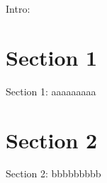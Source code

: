 \minitoc

\vspace{0.5cm}
Intro:

\section{Section 1}
Section 1: aaaaaaaaa

\section{Section 2}
Section 2: bbbbbbbbb